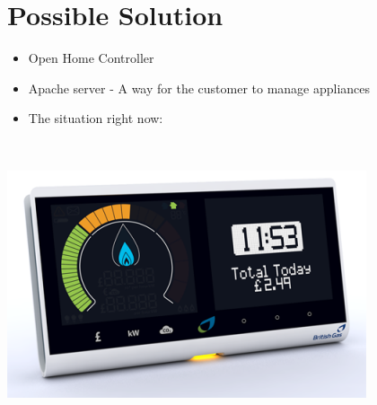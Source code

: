 \documentclass[10pt]{beamer}
\begin{document}
\section{Possible Solution}
\begin{frame}
	\begin{itemize}
		\item Open Home Controller
		\item Apache server - A way for the customer to manage appliances
		\item The situation right now:
	\end{itemize}
	~\\
	\begin{center}
	\includegraphics[scale=.25]{./graphics/smart_meter_display}
	\end{center}
\end{frame}

{\aauwavesbg
\begin{frame}
\end{frame}}
\end{document}
